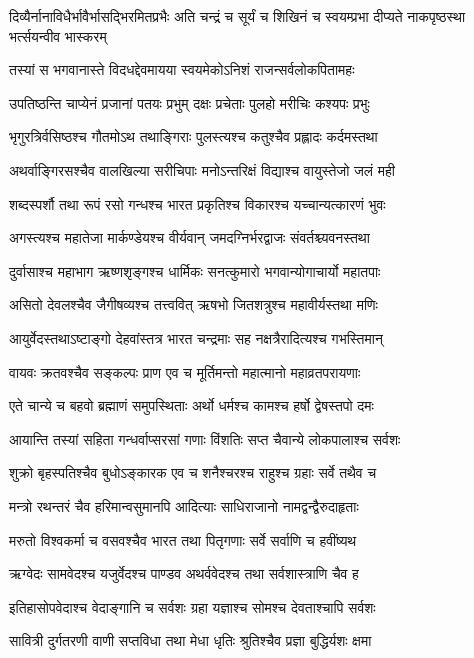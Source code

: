 दिव्यैर्नानाविधैर्भावैर्भासद्भिरमितप्रभैः
\twolineshloka
{अति चन्द्रं च सूर्यं च शिखिनं च स्वयम्प्रभा}
{दीप्यते नाकपृष्ठस्था भर्त्सयन्वीव भास्करम्}


\twolineshloka
{तस्यां स भगवानास्ते विदधद्देवमायया}
{स्वयमेकोऽनिशं राजन्सर्वलोकपितामहः}


\twolineshloka
{उपतिष्ठन्ति चाप्येनं प्रजानां पतयः प्रभुम्}
{दक्षः प्रचेताः पुलहो मरीचिः कश्यपः प्रभुः}


\threelineshloka
{भृगुरत्रिर्वसिष्ठश्च गौतमोऽथ तथाङ्गिराः}
{पुलस्त्यश्च कतुश्चैव प्रह्लादः कर्दमस्तथा}
{}


\twolineshloka
{अथर्वाङ्गिरसश्चैव वालखिल्या सरीचिपाः}
{मनोऽन्तरिक्षं विद्याश्च वायुस्तेजो जलं मही}


\twolineshloka
{शब्दस्पर्शौ तथा रूपं रसो गन्धश्च भारत}
{प्रकृतिश्च विकारश्च यच्चान्यत्कारणं भुवः}


\twolineshloka
{अगस्त्यश्च महातेजा मार्कण्डेयश्च वीर्यवान्}
{जमदग्निर्भरद्वाजः संवर्तश्च्यवनस्तथा}


\twolineshloka
{दुर्वासाश्च महाभाग ऋष्णशृङ्गश्च धार्मिकः}
{सनत्कुमारो भगवान्योगाचार्यो महातपाः}


\twolineshloka
{असितो देवलश्चैव जैगीषव्यश्च तत्त्ववित्}
{ऋषभो जितशत्रुश्च महावीर्यस्तथा मणिः}


\twolineshloka
{आयुर्वेदस्तथाऽष्टाङ्गो देहवांस्तत्र भारत}
{चन्द्रमाः सह नक्षत्रैरादित्यश्च गभस्तिमान्}


\twolineshloka
{वायवः क्रतवश्चैव सङ्कल्पः प्राण एव च}
{मूर्तिमन्तो महात्मानो महाव्रतपरायणाः}


\twolineshloka
{एते चान्ये च बहवो ब्रह्माणं समुपस्थिताः}
{अर्थो धर्मश्च कामश्च हर्षो द्वेषस्तपो दमः}


\twolineshloka
{आयान्ति तस्यां सहिता गन्धर्वाप्सरसां गणाः}
{विंशतिः सप्त चैवान्ये लोकपालाश्च सर्वशः}


\twolineshloka
{शुक्रो बृहस्पतिश्चैव बुधोऽङ्कारक एव च}
{शनैश्चरश्च राहुश्च ग्रहाः सर्वे तथैव च}


\twolineshloka
{मन्त्रो रथन्तरं चैव हरिमान्वसुमानपि}
{आदित्याः साधिराजानो नामद्वन्द्वैरुदाहृताः}


\twolineshloka
{मरुतो विश्वकर्मा च वसवश्चैव भारत}
{तथा पितृगणाः सर्वे सर्वाणि च हवींष्यथ}


\twolineshloka
{ऋग्वेदः सामवेदश्च यजुर्वेदश्च पाण्डव}
{अथर्ववेदश्च तथा सर्वशास्त्राणि चैव ह}


\twolineshloka
{इतिहासोपवेदाश्च वेदाङ्गानि च सर्वशः}
{ग्रहा यज्ञाश्च सोमश्च देवताश्चापि सर्वशः}


\twolineshloka
{सावित्री दुर्गतरणी वाणी सप्तविधा तथा}
{मेधा धृतिः श्रुतिश्चैव प्रज्ञा बुद्धिर्यशः क्षमा}


